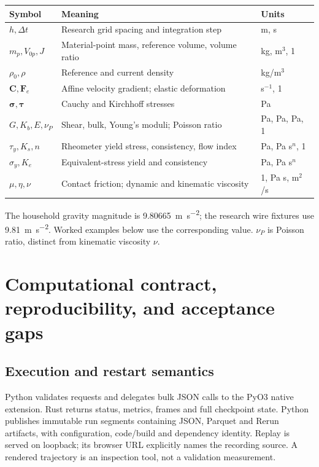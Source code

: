 \documentclass[11pt,a4paper]{article}
\numberwithin{equation}{section}
\begin{document}
\begin{center}\small
\begin{tabularx}{\linewidth}{lXl}
\toprule
Symbol & Meaning & Units\\
\midrule
$h,\Delta t$ & Research grid spacing and integration step & m, s\\
$m_p,V_{0p},J$ & Material-point mass, reference volume, volume ratio & kg, m$^3$, 1\\
$\rho_0,\rho$ & Reference and current density & kg/m$^3$\\
$\mathbf C,\mathbf F_e$ & Affine velocity gradient; elastic deformation & s$^{-1}$, 1\\
$\boldsymbol\sigma,\boldsymbol\tau$ & Cauchy and Kirchhoff stresses & Pa\\
$G,K_b,E,\nu_P$ & Shear, bulk, Young's moduli; Poisson ratio & Pa, Pa, Pa, 1\\
$\tau_y,K_s,n$ & Rheometer yield stress, consistency, flow index & Pa, Pa s$^n$, 1\\
$\sigma_y,K_e$ & Equivalent-stress yield and consistency & Pa, Pa s$^n$\\
$\mu,\eta,\nu$ & Contact friction; dynamic and kinematic viscosity & 1, Pa s, m$^2$/s\\
\bottomrule
\end{tabularx}
\end{center}
The household gravity magnitude is \SI{9.80665}{m.s^{-2}}; the research wire
fixtures use \SI{9.81}{m.s^{-2}}. Worked examples below use the corresponding
value. $\nu_P$ is Poisson ratio, distinct from kinematic viscosity $\nu$.






\section{Computational contract, reproducibility, and acceptance gaps}
\subsection{Execution and restart semantics}
Python validates requests and delegates bulk JSON calls to the PyO3 native
extension. Rust returns status, metrics, frames and full checkpoint state.
Python publishes immutable run segments containing JSON, Parquet and Rerun
artifacts, with configuration, code/build and dependency identity. Replay is
served on loopback; its browser URL explicitly names the recording source.
A rendered trajectory is an inspection tool, not a validation measurement.
\end{document}
